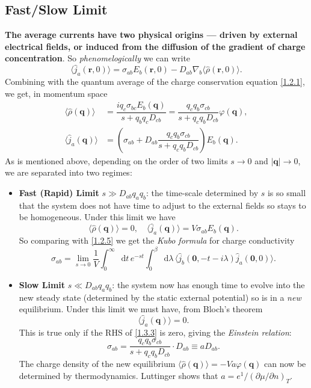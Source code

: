 \documentclass[10pt,nofootinbib,letterpaper]{revtex4}
\newcommand*\dd{\mathop{}\!\mathrm{d}}
\begin{document}
	\subsection{Fast/Slow Limit}
		\textbf{The average currents have two physical origins --- driven by external electrical fields, or induced from the diffusion of the gradient of charge concentration}. So \emph{phenomelogically} we can write
		\begin{equation}\label{1.3.1}
			\langle\hat j_a(\bm{r},0)\rangle=\sigma_{ab}E_b(\bm{r},0)-D_{ab}\nabla_b \langle\hat \rho(\bm{r},0)\rangle.
		\end{equation}
		Combining with the quantum average of the charge conservation equation \eqref{1.2.1}, we get, in momentum space
		\begin{align}
			\langle\hat\rho(\bm{q})\rangle&=\dfrac{iq_c\sigma_{bc}E_b(\bm{q})}{s+q_bq_cD_{cb}}=\dfrac{q_c q_b\sigma_{cb}}{s+q_c q_bD_{cb}}\varphi(\bm{q}),\label{1.3.2}\\
			\langle\hat j_a(\bm{q})\rangle&=\left(\sigma_{ab}+D_{ab}\dfrac{q_cq_b\sigma_{cb}}{s+q_c q_bD_{cb}}\right)E_b(\bm{q}).\label{1.3.3}
		\end{align}
		As is mentioned above, depending on the order of two limits $s\rightarrow0$ and $|\bm{q}|\rightarrow0$, we are separated into two regimes:
		\begin{itemize}
			\item {\color{red}\textbf{Fast (Rapid) Limit} $s\gg D_{ab}q_aq_b$: the time-scale determined by $s$ is so small that the system does not have time to adjust to the external fields so stays to be homogeneous}. Under this limit we have
			\begin{equation*}
				\langle\hat\rho(\bm{q})\rangle=0,\quad \langle\hat{j}_a(\bm{q})\rangle=V\sigma_{ab}E_b(\bm{q}).
			\end{equation*}
			So comparing with \eqref{1.2.5} we get the \emph{Kubo formula} for charge conductivity
			\begin{equation}\label{1.3.4}
				\sigma_{ab}=\lim_{s\rightarrow0}\dfrac{1}{V}\int_0^\infty\dd t\,e^{-st}\int_0^\beta\dd\lambda\,\langle \hat{j}_b(\bm{0},-t-i\lambda)\hat{j}_a(\bm{0},0)\rangle.
			\end{equation}
			\item {\color{red}\textbf{Slow Limit} $s\ll D_{ab}q_aq_b$: the system now has enough time to evolve into the new steady state (determined by the static external potential) so is in a \emph{new} equilibrium}. Under this limit we must have, from Bloch's theorem
			\begin{equation*}
				\langle\hat{j}_a(\bm{q})\rangle=0.
			\end{equation*}
			This is true only if the RHS of \eqref{1.3.3} is zero, giving the \emph{Einstein relation}:
			\begin{equation}\label{1.3.5}
				\sigma_{ab}=\dfrac{q_cq_b\sigma_{cb}}{s+q_cq_bD_{cb}}\cdot D_{ab}\equiv aD_{ab}.
			\end{equation}
			The charge density of the new equilibrium $\langle\hat{\rho}(\bm{q})\rangle=-Va\varphi(\bm{q})$ can now be determined by thermodynamics. Luttinger shows that $a=e^1/(\partial\mu/\partial n)_T$.
		\end{itemize}
\end{document}
